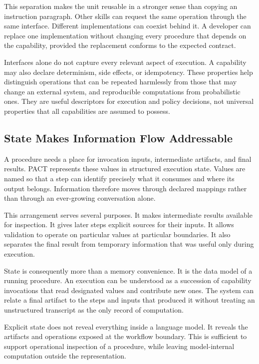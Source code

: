 \documentclass[10pt,twocolumn,a4paper]{article}
\begin{document}
This separation makes the unit reusable in a stronger sense than copying an instruction paragraph. Other skills can request the same operation through the same interface. Different implementations can coexist behind it. A developer can replace one implementation without changing every procedure that depends on the capability, provided the replacement conforms to the expected contract.


Interfaces alone do not capture every relevant aspect of execution. A capability may also declare determinism, side effects, or idempotency. These properties help distinguish operations that can be repeated harmlessly from those that may change an external system, and reproducible computations from probabilistic ones. They are useful descriptors for execution and policy decisions, not universal properties that all capabilities are assumed to possess.


\subsection{State Makes Information Flow Addressable}

A procedure needs a place for invocation inputs, intermediate artifacts, and final results. PACT represents these values in structured execution state. Values are named so that a step can identify precisely what it consumes and where its output belongs. Information therefore moves through declared mappings rather than through an ever-growing conversation alone.


This arrangement serves several purposes. It makes intermediate results available for inspection. It gives later steps explicit sources for their inputs. It allows validation to operate on particular values at particular boundaries. It also separates the final result from temporary information that was useful only during execution.


State is consequently more than a memory convenience. It is the data model of a running procedure. An execution can be understood as a succession of capability invocations that read designated values and contribute new ones. The system can relate a final artifact to the steps and inputs that produced it without treating an unstructured transcript as the only record of computation.


Explicit state does not reveal everything inside a language model. It reveals the artifacts and operations exposed at the workflow boundary. This is sufficient to support operational inspection of a procedure, while leaving model-internal computation outside the representation.
\end{document}
